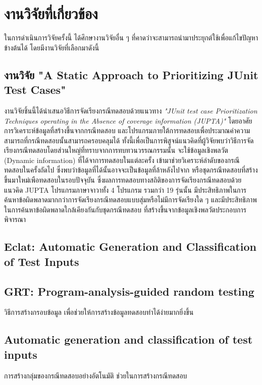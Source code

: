 \section{งานวิจัยที่เกี่ยวข้อง} 

ในการดำเนินการวิจัยครั้งนี้ ได้ศึกษางานวิจัยอื่น ๆ ที่คาดว่าจะสามารถนำมาประยุกต์ใช้เพื่อแก้ไขปัญหาข้างต้นได้ โดยมีงานวิจัยที่เลือกมาดังนี้

\subsection{งานวิจัย "A Static Approach to Prioritizing JUnit Test Cases" \cite{6363461}}

งานวิจัยชิ้นนี้ได้นำเสนอวิธีการจัดเรียงกรณีทดสอบด้วยแนวทาง \emph{"JUnit test case Prioritization Techniques operating in the Absence of coverage information (JUPTA)"} 
โดยอาศัยการวิเคราะห์ข้อมูล{\scg}ที่สร้างขึ้นจากกรณีทดสอบ และโปรแกรมภายใต้การทดสอบเพื่อประมาณค่าความสามารถที่กรณีทดสอบนั้นสามารถครอบคลุม{\sourcecode}ได้
ทั้งนี้เพื่อเป็นการพิสูจน์แนวคิดที่ผู้วิจัยพบว่าวิธีการจัดเรียงกรณีทดสอบโดยส่วนใหญ่ที่ทราบจากการทบทวนวรรณกรรมนั้น จะใช้ข้อมูลเชิงพลวัต (Dynamic information)
ที่ได้จาการทดสอบ{\sourcecode}ในแต่ละครั้ง เข้ามาช่วยวิเคราะห์ลำดับของกรณีทดสอบในครั้งถัดไป ซึ่งพบว่าข้อมูลที่ได้นั้นอาจจะเป็นข้อมูลที่ล้าหลังไปจาก{\sourcecode} 
หรือชุดกรณีทดสอบที่สร้างขึ้นมาใหม่เพือทดสอบในรอบปัจจุบัน ซึ่งผลการทดสอบทางสถิติของการจัดเรียงกรณีทดสอบด้วยแนวคิด JUPTA โปรแกรมภาษาจาวาทั้ง 4 โปรแกรม 
รวมกว่า 19 รุ่นนั้น มีประสิทธิภาพในการค้นหาข้อผิดพลาดมากกว่าการจัดเรียงกรณีทดสอบแบบสุ่มหรือไม่มีการจัดเรียงใด ๆ และมีประสิทธิภาพในการค้นหาข้อผิดพลาดใกล้เคียงกันกับชุดกรณีทดสอบ
ที่สร้างขึ้นจากข้อมูลเชิงพลวัตประกอบการพิจารณา

\subsection{Eclat: Automatic Generation and Classification of Test Inputs \cite{Heaton2000}}

\subsection{GRT: Program-analysis-guided random testing \cite{Ma2016}}
วิธีการสร้างกรอบข้อมูล เพื่อช่วยให้การสร้างข้อมูลทดสอบทำได้ง่ายมากยิ่งขึ้น

\subsection{Automatic generation and classification of test inputs \cite{Pacheco2005}}
การสร้างกลุ่มของกรณีทดสอบอย่างอัตโนมัติ ช่วยในการสร้างกรณีทดสอบ

